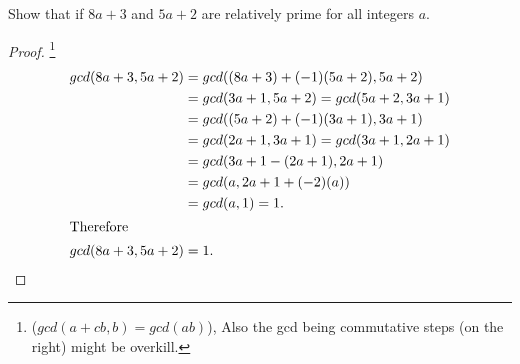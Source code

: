 \documentclass[12pt]{article}
\newenvironment{exercise}[2][Exercise]{\begin{trivlist}
\item[\hskip \labelsep {\bfseries #1}\hskip \labelsep {\bfseries #2.}]}{\end{trivlist}}
\begin{document}
\begin{exercise}{3.3.25} Show that if $8a+3$ and $5a+2$ are relatively prime for all integers $a$.
\end{exercise}
\begin{proof}
\footnote{($gcd(a+cb,b)=gcd(ab)$), Also the gcd being commutative steps (on the right) might be overkill.}
\begin{align*}
gcd(8a+3,5a+2)&=gcd((8a+3)+(-1)(5a+2),5a+2)\\
&=gcd(3a+1,5a+2)=gcd(5a+2,3a+1)\\
&=gcd((5a+2)+(-1)(3a+1),3a+1)\\
&=gcd(2a+1,3a+1)=gcd(3a+1,2a+1)\\
&=gcd(3a+1-(2a+1),2a+1)\\
&=gcd(a,2a+1+(-2)(a))\\
&=gcd(a,1)=1.\\
\intertext{Therefore}
gcd(8a+3,5a+2)&=1.
\end{align*}
\end{proof}


%












 
\end{document}
